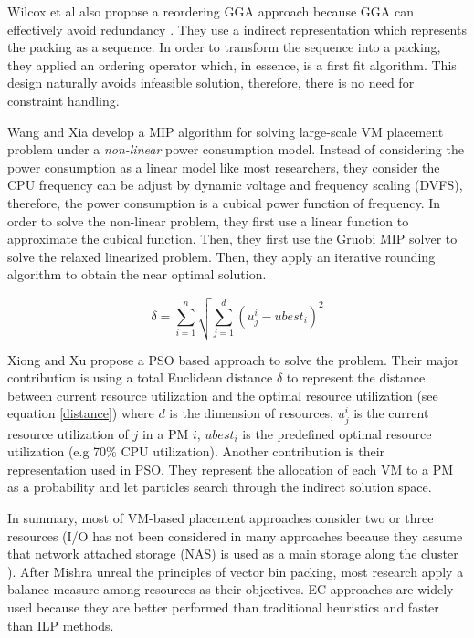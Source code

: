  Wilcox et al \cite{Wilcox:2011ea} also propose a reordering GGA approach because GGA can effectively avoid redundancy \cite{Falkenauer:1996hv}. They use a indirect representation \cite{Radcliffe:1991tp} which represents the packing as a sequence. In order to transform the sequence into a packing, they applied an ordering operator which, in essence, is a first fit algorithm. This design naturally avoids infeasible solution, therefore, there is no need for constraint handling. 

 Wang and Xia \cite{Wang:2016eha} develop a MIP algorithm for solving large-scale VM placement problem under a \emph{non-linear} power consumption model.  Instead of considering the power consumption as a linear model like most researchers, they consider the CPU frequency can be adjust by dynamic voltage and frequency scaling (DVFS), therefore, the power consumption is a cubical power function of frequency. In order to solve the non-linear problem, they first use a linear function to approximate the cubical function. Then, they first use the Gruobi MIP solver to solve the relaxed linearized problem. Then, they apply an iterative rounding algorithm to obtain the near optimal solution.   

\begin{equation} \label{distance}
	\delta = \sum_{i=1}^n \sqrt{\sum_{j=1}^d (u_j^i - ubest_i)^2}
\end{equation}

Xiong and Xu \cite{Xiong:2014jq} propose a PSO based approach to solve the problem. Their major contribution is using a total Euclidean distance $\delta$ to represent the distance between current resource utilization and the optimal resource utilization (see equation \ref{distance}) where $d$ is the dimension of resources, $u_j^i$ is the current resource utilization of $j$ in a PM $i$, $ubest_i$ is the predefined optimal resource utilization (e.g 70\% CPU utilization). Another contribution is their representation used in PSO. They represent the allocation of each VM to a PM as a probability and let particles search through the indirect solution space.

In summary, most of VM-based placement approaches consider two or three resources (I/O has not been considered in many approaches because they assume that network attached storage (NAS) is used as a main storage along the cluster \cite{Murtazaev:2014eo}). After Mishra unreal the principles of vector bin packing, most research apply a balance-measure among resources as their objectives. EC approaches are widely used because they are better performed than traditional heuristics and faster than ILP methods.


